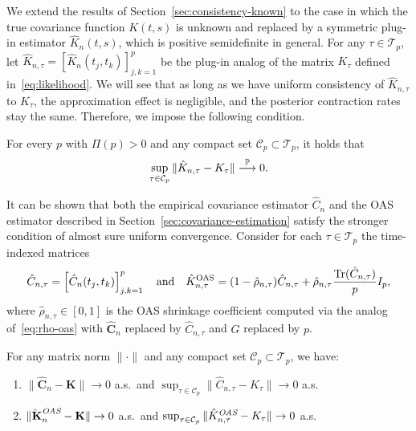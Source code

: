 We extend the results of Section~\ref{sec:consistency-known} to the case in which the true covariance function \(K(t,s)\) is unknown and replaced by a symmetric plug-in estimator \(\hat K_n(t,s)\), which is positive semidefinite in general. For any \(\tau\in\mathcal T_p\), let \(\hat K_{n,\tau} = [\hat K_n(t_j, t_k)]_{j,k=1}^p\) be the plug-in analog of the matrix \(K_\tau\) defined in~\eqref{eq:likelihood}. We will see that as long as we have uniform consistency of \(\hat K_{n,\tau}\) to \(K_\tau\), the approximation effect is negligible, and the posterior contraction rates stay the same. Therefore, we impose the following condition.

\begin{assumption}\label{ass:uniform-consistency-plug-in}
  For every \(p\) with \(\Pi(p)>0\) and any compact set \(\mathcal C_p\subset \mathcal T_p\), it holds that
  \[
  \sup_{\tau\in \mathcal C_p}\|\hat K_{n,\tau} - K_\tau\| \stackrel{\mathbb{P}}{\longrightarrow} 0.
  \]
\end{assumption}

It can be shown that both the empirical covariance estimator \(\hat C_n\) and the \acs{OAS} estimator described in Section~\ref{sec:covariance-estimation} satisfy the stronger condition of almost sure uniform convergence. Consider for each \(\tau\in\mathcal T_p\) the time-indexed matrices
\[
\hat{C}_{n,\tau} = \left[\hat C_n(t_j, t_k)\right]_{j,k=1}^p \quad \text{and}\quad \hat{K}_{n,\tau}^{\text{OAS}} = (1-\hat\rho_{n,\tau})\hat C_{n,\tau} + \hat\rho_{n,\tau}\frac{\operatorname{Tr}(\hat C_{n,\tau})}{p}I_p,
\]
where \(\hat\rho_{n,\tau}\in[0,1]\) is the \acs{OAS} shrinkage coefficient computed via the analog of~\eqref{eq:rho-oas} with \(\hat{\mathbf C}_n\) replaced by \(\hat{C}_{n,\tau}\) and \(G\) replaced by \(p\).

\begin{proposition}\label{prop:sample-cov-matrix-convergence}
  For any matrix norm \(\|\cdot\|\) and any compact set \(\mathcal C_p\subset \mathcal T_p\), we have:
  \begin{enumerate}[label=(\roman*)]
    \item \(\|\hat {\mathbf C}_n - \mathbf K\| \to 0\) a.s.\ and \(\sup_{\tau\in \mathcal C_p} \|\hat C_{n,\tau} - K_\tau\| \to 0\) a.s.
    \item \(\|\hatbfKnOASemph - \mathbf K\| \to 0\) a.s.\ and \(\sup_{\tau\in \mathcal C_p} \|\hat K^{\emph{OAS}}_{n,\tau} - K_\tau\| \to 0\) a.s.
  \end{enumerate}
\end{proposition}

